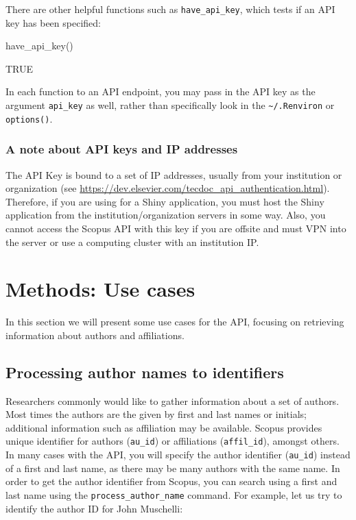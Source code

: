 There are other helpful functions such as \texttt{have\_api\_key}, which
tests if an API key has been specified:

\begin{Schunk}
\begin{Sinput}
have_api_key()
\end{Sinput}
\begin{Soutput}
[1] TRUE
\end{Soutput}
\end{Schunk}

In each function to an API endpoint, you may pass in the API key as the
argument \texttt{api\_key} as well, rather than specifically look in the
\texttt{\textasciitilde{}/.Renviron} or \texttt{options()}.

\hypertarget{a-note-about-api-keys-and-ip-addresses}{%
\subsubsection{A note about API keys and IP
addresses}\label{a-note-about-api-keys-and-ip-addresses}}

The API Key is bound to a set of IP addresses, usually from your
institution or organization (see
\url{https://dev.elsevier.com/tecdoc_api_authentication.html}).
Therefore, if you are using  for a Shiny application, you
must host the Shiny application from the institution/organization
servers in some way. Also, you cannot access the Scopus API with this
key if you are offsite and must VPN into the server or use a computing
cluster with an institution IP.

\hypertarget{methods-use-cases}{%
\section{Methods: Use cases}\label{methods-use-cases}}

In this section we will present some use cases for the API, focusing on
retrieving information about authors and affiliations.

\hypertarget{processing-author-names-to-identifiers}{%
\subsection{Processing author names to
identifiers}\label{processing-author-names-to-identifiers}}

Researchers commonly would like to gather information about a set of
authors. Most times the authors are the given by first and last names or
initials; additional information such as affiliation may be available.
Scopus provides unique identifier for authors (\texttt{au\_id}) or
affiliations (\texttt{affil\_id}), amongst others. In many cases with
the API, you will specify the author identifier (\texttt{au\_id})
instead of a first and last name, as there may be many authors with the
same name. In order to get the author identifier from Scopus, you can
search using a first and last name using the
\texttt{process\_author\_name} command. For example, let us try to
identify the author ID for John Muschelli:


